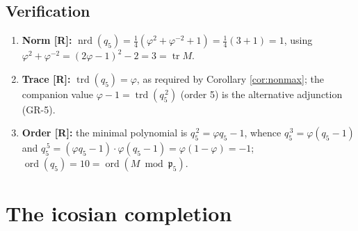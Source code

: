 \documentclass[11pt,a4paper]{article}
\theoremstyle{plain}
\theoremstyle{definition}
\theoremstyle{remark}
\newcommand{\pfive}{\mathfrak{p}_5}
\newcommand{\rtag}[1]{\textnormal{\textbf{[#1]}}}
\DeclareMathOperator{\trd}{trd}
\DeclareMathOperator{\nrd}{nrd}
\DeclareMathOperator{\ord}{ord}
\begin{document}
\subsection*{Verification}
\begin{enumerate}[label=\textup{(V\arabic*)}, leftmargin=2.6em]
\item \textbf{Norm \rtag{R}:} $\nrd(q_5) = \tfrac14(\varphi^2 + \varphi^{-2} + 1) = \tfrac14(3 + 1) = 1$, using $\varphi^2 + \varphi^{-2} = (2\varphi - 1)^2 - 2 = 3 = \operatorname{tr} M$.
\item \textbf{Trace \rtag{R}:} $\trd(q_5) = \varphi$, as required by Corollary \ref{cor:nonmax}; the companion value $\varphi - 1 = \trd(q_5^{\,2})$ (order 5) is the alternative adjunction (GR-5).
\item \textbf{Order \rtag{R}:} the minimal polynomial is $q_5^{\,2} = \varphi q_5 - 1$, whence $q_5^{\,3} = \varphi(q_5 - 1)$ and $q_5^{\,5} = (\varphi q_5 - 1)\cdot\varphi(q_5 - 1) = \varphi(1 - \varphi) = -1$; $\ord(q_5) = 10 = \ord(M \bmod \pfive)$.
\end{enumerate}

\section{The icosian completion}\label{sec:icosian}
\end{document}

